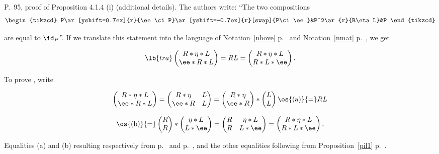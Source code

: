 \documentclass[12pt]{article}
\theoremstyle{remark}
\theoremstyle{definition}
\begin{document}
\begin{s} 
P.~95, proof of Proposition 4.1.4 (i) (additional details). The authors write: ``The two compositions 
$$
\begin{tikzcd}
P\ar[yshift=0.7ex]{r}{\ee\ci P}\ar[yshift=-0.7ex]{r}[swap]{P\ci\ee}&P^2\ar{r}{R\eta L}&P
\end{tikzcd}
$$ 

\nn are equal to $\id_P$''. If we translate this statement into the language of Notation~\ref{nhove} p.~ and Notation~\ref{nmat} p.~, we get 

\begin{equation}\lb{tra}
\begin{pmatrix}R*\eta*L\\ \ee*R*L\end{pmatrix}
=RL=\begin{pmatrix}R*\eta*L\\ R*L*\ee\end{pmatrix}.
\end{equation}

\nn To prove , write 

$$
\begin{pmatrix}R*\eta*L\\ \ee*R*L\end{pmatrix}
=\begin{pmatrix}R*\eta&L\\ \ee*R&L\end{pmatrix}
=\begin{pmatrix}R*\eta\\ \ee*R\end{pmatrix}*\begin{pmatrix}L\\ L\end{pmatrix}
\os{\text{(a)}}{=}RL
$$

$$
\os{\text{(b)}}{=}\begin{pmatrix}R\\ R\end{pmatrix}*\begin{pmatrix}\eta*L\\ L*\ee\end{pmatrix}
=\begin{pmatrix}R&\eta*L\\ R&L*\ee\end{pmatrix}
=\begin{pmatrix}R*\eta*L\\ R*L*\ee\end{pmatrix},
$$ 

\nn Equalities (a) and (b) resulting respectively from  p.~ and  p.~, and the other equalities following from Proposition~\ref{pil1} p.~. 
\end{s}
\end{document}

